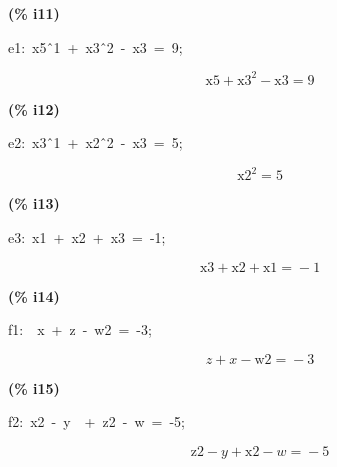 \documentclass[fleqn]{article}
\begin{document}
\noindent
\begin{minipage}[t]{4.000000em}\color{red}\bfseries
(\% i11)	
\end{minipage}
\begin{minipage}[t]{\textwidth}\color{blue}
e1:\ x5\^\ 1\ +\ x3\^\ 2\ -\ x3\ =\ 9;
\end{minipage}
\[\displaystyle \tag{e1} 
\ensuremath{\mathrm{x5}}\mathop{+}{{\ensuremath{\mathrm{x3}}}^{2}}\mathop{-}\ensuremath{\mathrm{x3}}\mathop{=}9\mbox{}
\]


\noindent
\begin{minipage}[t]{4.000000em}\color{red}\bfseries
(\% i12)	
\end{minipage}
\begin{minipage}[t]{\textwidth}\color{blue}
e2:\ x3\^\ 1\ +\ x2\^\ 2\ -\ x3\ =\ 5;\ 
\end{minipage}
\[\displaystyle \tag{e2} 
{{\ensuremath{\mathrm{x2}}}^{2}}\mathop{=}5\mbox{}
\]


\noindent
\begin{minipage}[t]{4.000000em}\color{red}\bfseries
(\% i13)	
\end{minipage}
\begin{minipage}[t]{\textwidth}\color{blue}
e3:\ x1\ +\ x2\ +\ x3\ =\ -1;
\end{minipage}
\[\displaystyle \tag{e3} 
\ensuremath{\mathrm{x3}}\mathop{+}\ensuremath{\mathrm{x2}}\mathop{+}\ensuremath{\mathrm{x1}}\mathop{=}\mathop{-}1\mbox{}
\]


\noindent
\begin{minipage}[t]{4.000000em}\color{red}\bfseries
(\% i14)	
\end{minipage}
\begin{minipage}[t]{\textwidth}\color{blue}
f1:\ \ x\ +\ z\ -\ w2\ =\ -3;\ 
\end{minipage}
\[\displaystyle \tag{f1} 
z\mathop{+}x\mathop{-}\ensuremath{\mathrm{w2}}\mathop{=}\mathop{-}3\mbox{}
\]


\noindent
\begin{minipage}[t]{4.000000em}\color{red}\bfseries
(\% i15)	
\end{minipage}
\begin{minipage}[t]{\textwidth}\color{blue}
f2:\ x2\ -\ y\ \ +\ z2\ -\ w\ =\ -5;
\end{minipage}
\[\displaystyle \tag{f2} 
\ensuremath{\mathrm{z2}}\mathop{-}y\mathop{+}\ensuremath{\mathrm{x2}}\mathop{-}w\mathop{=}\mathop{-}5\mbox{}
\]
\end{document}
